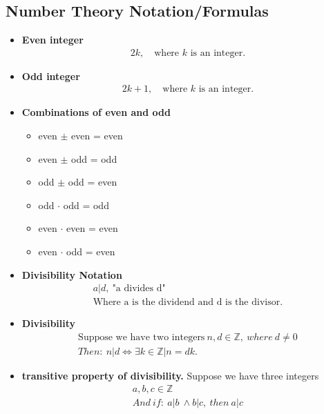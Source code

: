\documentclass{report}
\begin{document}
      \subsection{Number Theory Notation/Formulas}
      \bigbreak \noindent 
      \begin{itemize}
        \item \textbf{Even integer}
          \begin{align*}
            2k, \quad \text{where $k $ is an integer}
          .\end{align*}
        \item \textbf{Odd integer}
          \begin{align*}
            2k + 1, \quad \text{where $k $ is an integer}
          .\end{align*}
        \item \textbf{Combinations of even and odd}
          \begin{itemize}
            \item even $\pm $ even = even
            \item even $\pm $ odd  = odd
            \item odd $\pm $ odd = even
            \item odd $\cdot$ odd = odd
            \item even $\cdot$ even = even
            \item even $\cdot$ odd = even
          \end{itemize}
        \item \textbf{Divisibility Notation}
          \begin{align*}
            a | d,\ \text{"a divides d"} \\
            \text{Where a is the dividend and d is the divisor}
          .\end{align*}
        \item \textbf{Divisibility}
          \begin{align*}
            \text{Suppose we have two integers}\ n, d \in \mathbb{Z},\ where\ d \ne 0 \\
            Then:\ n|d \iff \exists k \in \mathbb{Z} | n = dk
          .\end{align*}
        \item \textbf{transitive property of divisibility.} Suppose we have three integers
          \begin{align*}
            a,b,c \in \mathbb{Z}\\
            And\ if:\ a|b\ \land b|c,\ then\ a|c

\end{align*}
\end{itemize}
\end{document}
